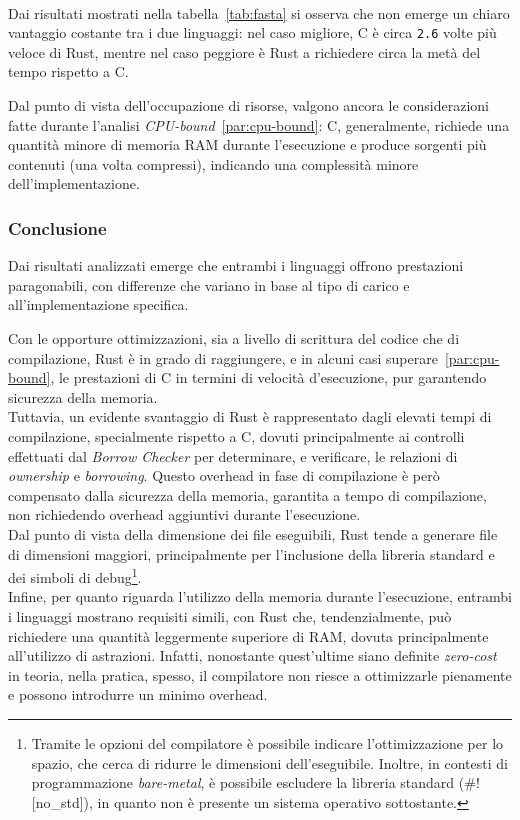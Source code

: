 \vspace{6pt}\\
\noindent Dai risultati mostrati nella tabella~\ref{tab:fasta} si osserva che non emerge un chiaro vantaggio costante tra i due linguaggi:
nel caso migliore, C è circa \texttt{2.6} volte più veloce di Rust, mentre nel caso peggiore è Rust a richiedere circa la metà del tempo rispetto a C.

Dal punto di vista dell'occupazione di risorse, valgono ancora le considerazioni fatte durante l'analisi \textit{CPU-bound}~\ref{par:cpu-bound}: C, generalmente, richiede una quantità minore di memoria RAM durante l'esecuzione e
produce sorgenti più contenuti (una volta compressi), indicando una complessità minore dell'implementazione.

\subsubsection{Conclusione} 
Dai risultati analizzati emerge che entrambi i linguaggi offrono prestazioni paragonabili, con differenze che variano in base al tipo di carico e all'implementazione specifica.

Con le opporture ottimizzazioni, sia 
a livello di scrittura del codice che di compilazione, Rust è in grado di raggiungere, e in alcuni casi superare~\ref{par:cpu-bound}, le prestazioni di C in termini di velocità d'esecuzione, pur garantendo sicurezza della memoria. \hfill
\vspace{5pt}\\
\noindent Tuttavia, un evidente svantaggio di Rust è rappresentato dagli elevati tempi di compilazione, specialmente rispetto a C, dovuti principalmente ai controlli effettuati dal \textit{Borrow Checker} per determinare, e verificare, le relazioni di \textit{ownership} e \textit{borrowing}.
Questo overhead in fase di compilazione è però compensato dalla sicurezza della memoria, garantita a tempo di compilazione, non richiedendo overhead aggiuntivi durante l'esecuzione. \hfill
\vspace{5pt}\\
\noindent Dal punto di vista della dimensione dei file eseguibili, Rust tende a generare file di dimensioni maggiori, principalmente per l'inclusione della libreria standard e dei simboli di debug\footnote{Tramite le opzioni del compilatore è possibile indicare l'ottimizzazione per lo spazio, che cerca di ridurre le dimensioni dell'eseguibile. Inoltre, in contesti di programmazione \textit{bare-metal}, è possibile escludere la libreria standard (\#![no\_std]), in quanto non è presente un sistema operativo sottostante.}. \hfill
\vspace{5pt}\\
\noindent Infine, per quanto riguarda l'utilizzo della memoria durante l'esecuzione, entrambi i linguaggi mostrano requisiti simili, con Rust che, tendenzialmente, può richiedere una quantità leggermente superiore di RAM, dovuta principalmente all'utilizzo di astrazioni.
Infatti, nonostante quest'ultime siano definite \textit{zero-cost} in teoria, nella pratica, spesso, il compilatore non riesce a ottimizzarle pienamente e possono introdurre un minimo overhead.

